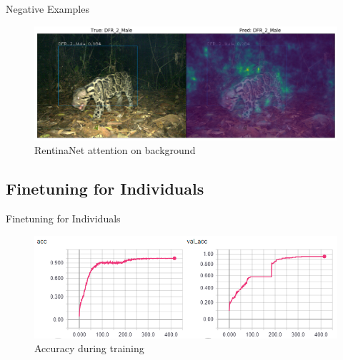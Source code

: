\documentclass[10pt]{beamer}
\begin{document}

\begin{frame}{Negative Examples}
	\centering
	\begin{figure}
		\includegraphics[width=\columnwidth]{images/RetinaNet_No_Attention_correct2.png}
		\caption{RentinaNet attention on background}
	\end{figure}
\end{frame}

\subsection{Finetuning for Individuals}

\begin{frame}{Finetuning for Individuals}
	\centering
	\begin{figure}
		\includegraphics[width=.9\columnwidth,height=\textheight,keepaspectratio]{images/Acc_finetune_leo_both.png}
		\caption{Accuracy during training}
	\end{figure}
\end{frame}

\end{document}

